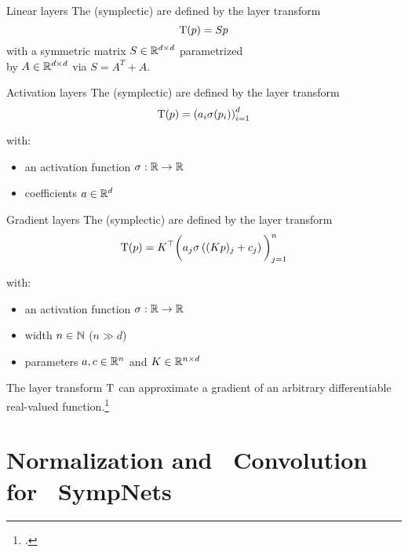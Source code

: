\begin{frame}[c]{Linear layers}
  The (symplectic)  are defined by the layer transform
  \begin{equation*}
    \mathrm{T}(p) = Sp
  \end{equation*}
  with a symmetric matrix $S \in \mathbb{R}^{d \times d}$ parametrized\\
  by $A \in \mathbb{R}^{d \times d}$ via $S=A^T+A$.
  \vspace{1cm}
\end{frame}

\begin{frame}[c]{Activation layers}
  The (symplectic)  are defined by the layer transform
  \begin{equation*}
    \mathrm{T}(p) = \left( a_i \sigma(p_i) \right)_{i=1}^d
  \end{equation*}

  with:
  \begin{itemize}
    \item an activation function $\sigma : \mathbb{R} \to \mathbb{R}$
    \item coefficients $a \in \mathbb{R}^d$ 
  \end{itemize}
\end{frame}

\begin{frame}[c]{Gradient layers}
  The (symplectic)  are defined by the layer transform
  \begin{equation*}
    \mathrm{T}(p) = K^\top \bigg( a_j \sigma \left( (Kp)_j + c_j \right) \bigg)_{j=1}^n
  \end{equation*}

  with:
  \begin{itemize}
    \item an activation function $\sigma : \mathbb{R} \to \mathbb{R}$
    \item width $n \in \mathbb{N}$ ($n \gg d$)
    \item parameters $a,c \in \mathbb{R}^n$ and $K \in \mathbb{R}^{n \times d}$
  \end{itemize}

  \vspace{0.3cm}
  The layer transform $\mathrm{T}$ can approximate a gradient of an arbitrary
  differentiable real-valued function.\footcite{Jin2020}
\end{frame}

\section{Normalization and ~\newline Convolution for ~\newline SympNets}

